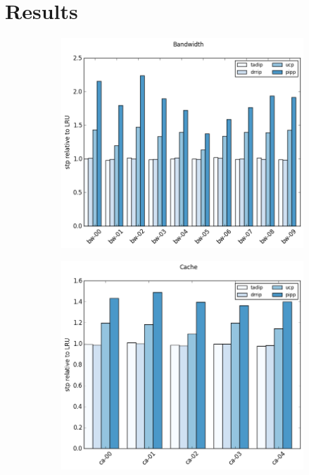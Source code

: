 
\chapter{Results}
\label{cpt:results}

\begin{figure}[ht]
        \centering
        \begin{subfigure}[b]{0.5\textwidth}
                \includegraphics[width=\textwidth]{../experiments/archives/02-algorithm-test/_figures/speedup/stp-bw.png}
                \label{fig:processor_model:sensitivity:ol}
        \end{subfigure}%
        \begin{subfigure}[b]{0.5\textwidth}
                \includegraphics[width=\textwidth]{../experiments/archives/02-algorithm-test/_figures/speedup/stp-ca.png}

\end{subfigure}
\end{figure}
